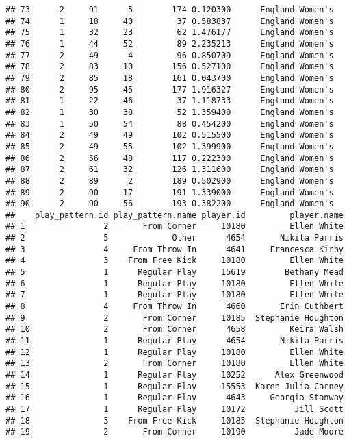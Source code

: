 \documentclass[]{article}
\begin{document}
\begin{verbatim}
## 73      2     91      5        174 0.120300      England Women's
## 74      1     18     40         37 0.583837      England Women's
## 75      1     32     23         62 1.476177      England Women's
## 76      1     44     52         89 2.235213      England Women's
## 77      2     49      4         96 0.850709      England Women's
## 78      2     83     10        156 0.527100      England Women's
## 79      2     85     18        161 0.043700      England Women's
## 80      2     95     45        177 1.916327      England Women's
## 81      1     22     46         37 1.118733      England Women's
## 82      1     30     38         52 1.359400      England Women's
## 83      1     50     54         88 0.454200      England Women's
## 84      2     49     49        102 0.515500      England Women's
## 85      2     49     55        102 1.399900      England Women's
## 86      2     56     48        117 0.222300      England Women's
## 87      2     61     32        126 1.311600      England Women's
## 88      2     89      2        189 0.502900      England Women's
## 89      2     90     17        191 1.339000      England Women's
## 90      2     90     56        193 0.382200      England Women's
##    play_pattern.id play_pattern.name player.id         player.name
## 1                2       From Corner     10180         Ellen White
## 2                5             Other      4654       Nikita Parris
## 3                4     From Throw In      4641     Francesca Kirby
## 4                3    From Free Kick     10180         Ellen White
## 5                1      Regular Play     15619        Bethany Mead
## 6                1      Regular Play     10180         Ellen White
## 7                1      Regular Play     10180         Ellen White
## 8                4     From Throw In      4660       Erin Cuthbert
## 9                2       From Corner     10185  Stephanie Houghton
## 10               2       From Corner      4658         Keira Walsh
## 11               1      Regular Play      4654       Nikita Parris
## 12               1      Regular Play     10180         Ellen White
## 13               2       From Corner     10180         Ellen White
## 14               1      Regular Play     10252      Alex Greenwood
## 15               1      Regular Play     15553  Karen Julia Carney
## 16               1      Regular Play      4643     Georgia Stanway
## 17               1      Regular Play     10172          Jill Scott
## 18               3    From Free Kick     10185  Stephanie Houghton
## 19               2       From Corner     10190          Jade Moore

\end{verbatim}
\end{document}
